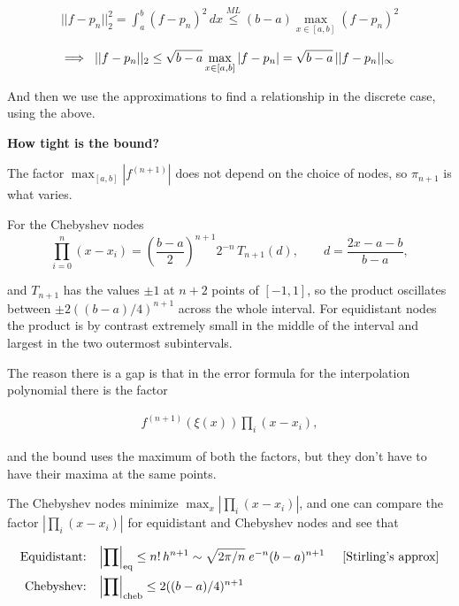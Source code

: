 \documentclass{article}
\begin{document}
\begin{align*}
    ||f - p_n||_2^2 = \int_a^b (f - p_n)^2 \, dx \overset{ML}{\le} (b-a) \max_{x \in [a,b]} (f-p_n)^2
\end{align*}

\begin{align*}
    \Longrightarrow \hspace{2mm} ||f - p_n||_2 \le \sqrt{b-a} \max_{x \in [a,b]} |f - p_n| = \sqrt{b-a} \, ||f - p_n||_{\infty}
\end{align*}

And then we use the approximations to find a relationship in the discrete case, using the above.

\vspace{5mm}
\textbf{How tight is the bound?}
\vspace{5mm}

The factor $\max_{[a,b]}|f^{(n+1)}|$ does not depend on the choice of nodes, so $\pi_{n+1}$ is what varies. 

For the Chebyshev nodes \[   \prod_{i=0}^{n}(x - x_i) = \left(\frac{b-a}{2}\right)^{\! n+1} 2^{-n}\,T_{n+1}(d),   \qquad d = \frac{2x - a - b}{b - a}, \] 

and $T_{n+1}$ has the values $\pm 1$ at $n+2$ points of $[-1,1]$, so the product oscillates between $\pm 2\left((b-a)/4\right)^{n+1}$ across the whole interval. For equidistant nodes the product is by contrast extremely small in the middle of the interval and largest in the two outermost subintervals.

\vspace{5mm}
The reason there is a gap is that in the error formula for the interpolation polynomial there
is the factor

\begin{align*}
    f^{(n+1)}(\xi(x)) \prod_i (x - x_i),
\end{align*}

and the bound uses the maximum of both the factors, but they don't have to have their maxima
at the same points.

\vspace{5mm}
The Chebyshev nodes minimize $\max_x |\prod_i (x-x_i)|$, and one can compare the factor
$|\prod_i (x - x_i)|$ for equidistant and Chebyshev nodes and see that

\begin{align*}
    \text{Equidistant:} \hspace{3mm} &\left|\prod\right|_{\text{eq}} \le n! \, h^{n+1} \sim \sqrt{2\pi/n} \; e^{-n} (b-a)^{n+1} \hspace{5mm} [\text{Stirling's approx}] \\
    \text{Chebyshev:} \hspace{3mm} &\left|\prod\right|_{\text{cheb}} \le 2 ((b-a)/4)^{n+1}
\end{align*}
\end{document}
